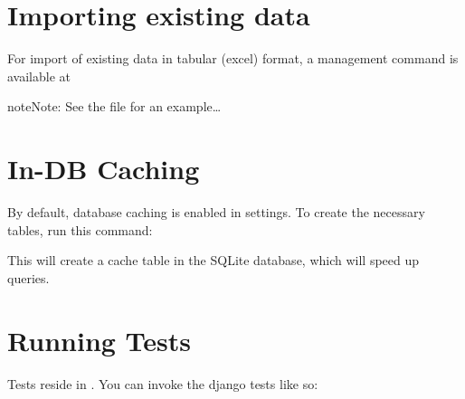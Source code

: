 \documentclass[letterpaper,10pt,openany,oneside,english]{sphinxmanual}
\begin{document}
\section{Importing existing data}
\label{\detokenize{index:importing-existing-data}}
For import of existing data in tabular (excel) format, a management command is available at

%
\begin{sphinxVerbatim}[commandchars=\\\{\}]
  
\end{sphinxVerbatim}

\begin{sphinxadmonition}{note}{Note:}
See the file  for an example…
\end{sphinxadmonition}

\noindent{}


\section{In-DB Caching}
\label{\detokenize{index:in-db-caching}}
By default, database caching is enabled in settings. To create the necessary tables, run this
command:

%
\begin{sphinxVerbatim}[commandchars=\\\{\}]
  
\end{sphinxVerbatim}

This will create a cache table in the SQLite database, which will speed up queries.


\section{Running Tests}
\label{\detokenize{index:running-tests}}
Tests reside in .
You can invoke the django tests like so:

%
\begin{sphinxVerbatim}[commandchars=\\\{\}]
  
\end{sphinxVerbatim}
\end{document}
